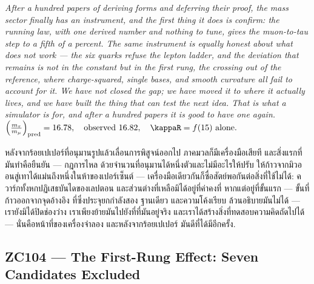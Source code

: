 \documentclass[12pt, a4paper]{article}
\begin{document}
\bigskip
\begin{center}
\textit{%
After a hundred papers of deriving forms and deferring their proof, the mass
sector finally has an instrument, and the first thing it does is confirm: the
running law, with one derived number and nothing to tune, gives the
muon-to-tau step to a fifth of a percent. The same instrument is equally honest
about what does not work --- the six quarks refuse the lepton ladder, and the
deviation that remains is not in the constant but in the first rung, the
crossing out of the reference, where charge-squared, single bases, and smooth
curvature all fail to account for it. We have not closed the gap; we have moved
it to where it actually lives, and we have built the thing that can test the
next idea. That is what a simulator is for, and after a hundred papers it is
good to have one again.}\\[0.5em]
$\displaystyle
  \Big(\tfrac{m_\tau}{m_\mu}\Big)_{\rm pred}=16.78,\quad
  \text{observed }16.82,\quad
  \kappaR=f(15)\ \text{alone.}$

\medskip
{\thaifont
หลังจากร้อยเปเปอร์ที่อนุมานรูปแล้วเลื่อนการพิสูจน์ออกไป ภาคมวลก็มีเครื่องมือเสียที และสิ่งแรกที่มันทำคือยืนยัน ---
กฎการไหล ด้วยจำนวนที่อนุมานได้หนึ่งตัวและไม่มีอะไรให้ปรับ ให้ก้าวจากมิวออนสู่เทาได้แม่นถึงหนึ่งในห้าของเปอร์เซ็นต์ ---
เครื่องมือเดียวกันก็ซื่อสัตย์พอกันต่อสิ่งที่ใช้ไม่ได้: ควาร์กทั้งหกปฏิเสธบันไดของเลปตอน และส่วนต่างที่เหลือมิได้อยู่ที่ค่าคงที่ หากแต่อยู่ที่ขั้นแรก ---
ขั้นที่ก้าวออกจากจุดอ้างอิง ที่ซึ่งประจุยกกำลังสอง ฐานเดียว และความโค้งเรียบ ล้วนอธิบายมันไม่ได้ ---
เรายังมิได้ปิดช่องว่าง เราเพียงย้ายมันไปยังที่ที่มันอยู่จริง และเราได้สร้างสิ่งที่ทดสอบความคิดถัดไปได้ ---
นั่นคือหน้าที่ของเครื่องจำลอง และหลังจากร้อยเปเปอร์ มันดีที่ได้มีอีกครั้ง.}
\end{center}



\subsection{ZC104 --- The First-Rung Effect: Seven Candidates Excluded}
\end{document}
